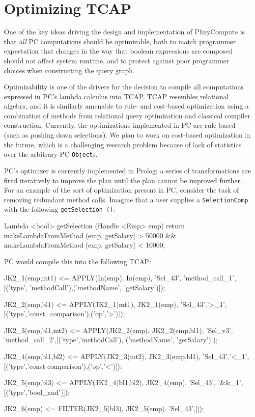 
\section{Optimizing TCAP}
\label{sec:optimizer}

One of the key ideas driving the design and implementation of PlinyCompute is that \emph{all} PC computations should be optimizable, both to
match programmer expectation
that changes in the way that boolean expressions are composed should
not affect system runtime, and 
to protect against poor programmer choices when constructing the query graph.

Optimizability is one of the drivers for
the decision to compile all computations expressed in PC's lambda calculus into TCAP.  
TCAP resembles relational algebra, and it is similarly amenable to rule- and cost-based optimization
using a combination of methods from relational query optimization and classical compiler construction.
Currently, the optimizations implemented in PC are rule-based (such as pushing down selections).  We plan to work on cost-based optimization
in the future, which is a challenging research problem because of lack of statistics over the arbitrary PC \texttt{Object}s.

PC's optimizer is currently implemented
in Prolog; a series of transformations are fired iteratively to improve the plan until the plan cannot be improved further.
For an example of the sort of optimization present in PC, consider the task of removing redundant method calls.  Imagine that a user
supplies a \texttt{SelectionComp} with the following \texttt{getSelection ()}:

\begin{codesmall} 
Lambda <bool> getSelection (Handle  <Emp> emp) {
   return makeLambdaFromMethod
      (emp, getSalary) > 50000 &&
      makeLambdaFromMethod (emp, getSalary) < 10000;
}	
\end{codesmall}

\noindent PC would compile this into the following TCAP:

\begin{codesmall}
JK2_1(emp,mt1) <= APPLY(In(emp), In(emp), 'Sel_43',
'method_call_1',[('type', 'methodCall'),('methodName',
'getSalary')]);

JK2_2(emp,bl1) <= APPLY(JK2_1(mt1), JK2_1(emp), 
'Sel_43','>_1',[('type','const_comparison'),('op','>')]);

JK2_3(emp,bl1,mt2) <= APPLY(JK2_2(emp), JK2_2(emp,bl1), 
'Sel_v3', 'method_call_2',[('type','methodCall'), 
('methodName', 'getSalary')]);

JK2_4(emp,bl1,bl2) <= APPLY(JK2_3(mt2), JK2_3(emp,bl1), 
'Sel_43','<_1',[('type','const comparison'),('op','<')]);

JK2_5(emp,bl3) <= APPLY(JK2_4(bl1,bl2), JK2_4(emp), 
'Sel_43', '&&_1',[('type','bool_and')]);

JK2_6(emp) <= FILTER(JK2_5(bl3), JK2_5(emp), 'Sel_43',[]);
\end{codesmall}

